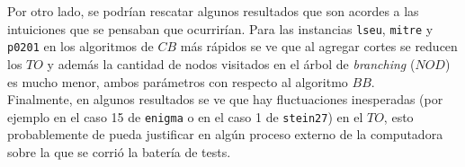 Por otro lado, se podrían rescatar algunos resultados que son acordes a las intuiciones que se pensaban que ocurrirían. Para las instancias \verb_lseu_, \verb_mitre_ y \verb_p0201_ en los algoritmos de $CB$ más rápidos se ve que al agregar cortes se reducen los $TO$ y además la cantidad de nodos visitados en el árbol de \emph{branching} ($NOD$) es mucho menor, ambos parámetros con respecto al algoritmo $BB$.\\

Finalmente, en algunos resultados se ve que hay fluctuaciones inesperadas (por ejemplo en el caso 15 de \verb_enigma_ o en el caso 1 de \verb_stein27_) en el $TO$, esto probablemente de pueda justificar en algún proceso externo de la computadora sobre la que se corrió la batería de tests.\\

